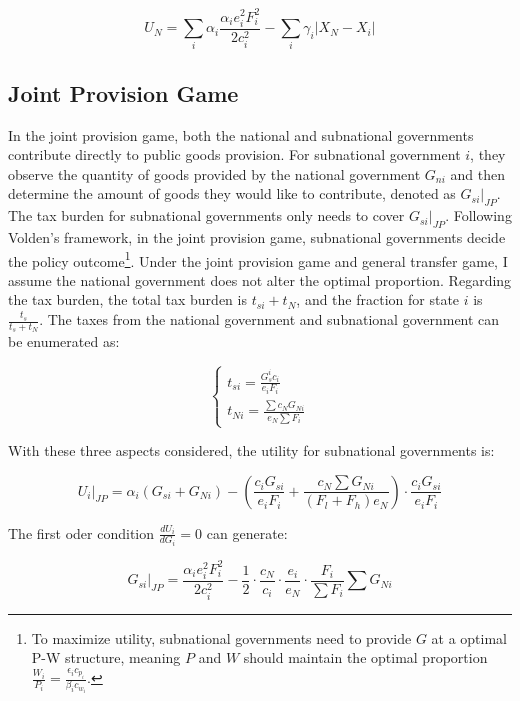 \documentclass[man]{apa7}
\begin{document}
\begin{equation}
  U_N=\sum_i\alpha_i \frac{\alpha_i e_i^2 F_i^2}{2 c_i^2}-\sum_i \gamma_i|X_N-X_i| \label{utilityforN}
\end{equation}

\subsection{Joint Provision Game}

In the joint provision game, both the national and subnational governments contribute directly to public goods provision. For subnational government $i$, they observe the quantity of goods provided by the national government $G_{ni}$ and then determine the amount of goods they would like to contribute, denoted as $G_{si}|_{JP}$. The tax burden for subnational governments only needs to cover $G_{si}|_{JP}$. Following Volden's framework, in the joint provision game, subnational governments decide the policy outcome\footnote{To maximize utility, subnational governments need to provide $G$ at a optimal P-W structure, meaning $P$ and $W$ should maintain the optimal proportion $\frac{W_i}{P_i}=\frac{\epsilon_i c_{p_i}}{\beta_i c_{w_i}}$.}. Under the joint provision game and general transfer game, I assume the national government does not alter the optimal proportion. Regarding the tax burden, the total tax burden is $t_{si}+t_N$, and the fraction for state $i$ is $\frac{t_s}{t_s+t_N}$. The taxes from the national government and subnational government can be enumerated as: %

$$
  \left\{\begin{array}{l}
    t_{si}= \frac{G_s^i c_{i}}{e_i F_i} \\
    t_{Ni}=\frac{\sum c_N G_{Ni}}{e_N\sum F_i }
  \end{array}\right.
$$

With these three aspects considered, the utility for subnational governments is:

\begin{equation}
  U_i|_{JP}=\alpha_i (G_{si}+G_{Ni})-\left(\frac{c_i G_{si}}{e_i F_i}+ \frac{c_N \sum G_{Ni}}{(F_l+F_h) e_N}\right) \cdot \frac{c_i G_{si}}{e_i F_i}
\end{equation}

The first oder condition $\frac{dU_i}{dG_i}=0$ can generate:

\begin{equation}
  G_{si}|_{JP}=\frac{\alpha_ie_i^2F_i^2}{2c_i^2}-\frac{1}{2}\cdot\frac{c_N}{c_i}\cdot\frac{e_i}{e_N}\cdot\frac{F_i}{\sum F_i}\sum G_{Ni} \label{jpG}
\end{equation}
\end{document}
